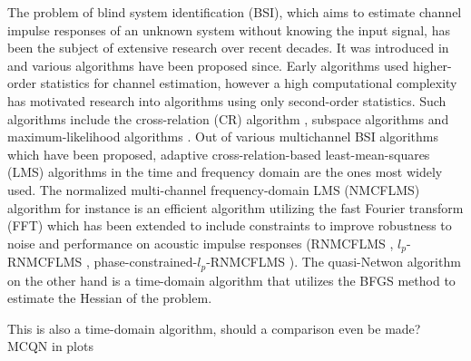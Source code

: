 \documentclass{article}
\begin{document}
The problem of blind system identification (BSI), which aims to estimate channel impulse responses of an unknown system without knowing the input signal, has been the subject of extensive research over recent decades.
It was introduced in \cite{satoMethodSelfRecoveringEqualization1975} and various algorithms have been proposed since.
Early algorithms used higher-order statistics \cite{godardSelfRecoveringEqualizationCarrier1980,tongNewApproachBlind1991,mendelTutorialHigherorderStatistics1991} for channel estimation, however a high computational complexity has motivated research into algorithms using only second-order statistics.
Such algorithms include the cross-relation (CR) algorithm \cite{langtongBlindIdentificationEqualization1994, guanghanxuLeastsquaresApproachBlind1995}, subspace algorithms \cite{moulinesSubspaceMethodsBlind1995,gannotSubspaceMethodsMultimicrophone2003,diamantarasEfficientSubspaceMethod2008,mayyalaStructureBasedSubspaceMethod2017} and maximum-likelihood algorithms \cite{yingbohuaFastMaximumLikelihood1996}.
Out of various multichannel BSI algorithms which have been proposed, adaptive cross-relation-based least-mean-squares (LMS) algorithms in the time and frequency domain are the ones most widely used.
The normalized multi-channel frequency-domain LMS (NMCFLMS) \cite{huangAdaptiveMultichannelLeast2002,huangClassFrequencydomainAdaptive2003} algorithm for instance is an efficient algorithm utilizing the fast Fourier transform (FFT) which has been extended to include constraints to improve robustness to noise and performance on acoustic impulse responses (RNMCFLMS \cite{huNoiseRobustBlind2015}, \(l_p\)-RNMCFLMS \cite{heNoiseRobustFrequencyDomain2018}, phase-constrained-\(l_p\)-RNMCFLMS \cite{joRobustBlindMultichannel2021}).
The quasi-Netwon algorithm \cite{habetsOnlineQuasiNewtonAlgorithm2010} on the other hand is a time-domain algorithm that utilizes the BFGS method to estimate the Hessian of the problem.
\begin{todo}
    This is also a time-domain algorithm, should a comparison even be made? MCQN in plots
\end{todo}
\end{document}
